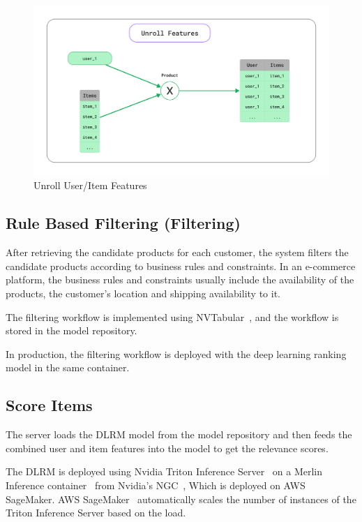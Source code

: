 \begin{figure}[H]
    \centering
    \includegraphics[width=\textwidth]{assets/Unroll Features.png}
    \caption{Unroll User/Item Features}
    \label{fig: UnrollUserFeatures}
\end{figure}


\subsection{Rule Based Filtering (Filtering)}

After retrieving the candidate products for each customer, the system filters the candidate products according to business rules and constraints.
In an e-commerce platform, the business rules and constraints usually include the availability of the products, the customer's location and shipping availability to it.


The filtering workflow is implemented using NVTabular~\cite{MerlinNVTabular}, and the workflow is stored in the model repository.

In production, the filtering workflow is deployed with the deep learning ranking model in the same container.


\subsection{Score Items}

The server loads the DLRM model from the model repository and then feeds the combined user and item features into the model to get the relevance scores.

The DLRM is deployed using Nvidia Triton Inference Server~\cite{Triton} on a Merlin Inference container~\cite{NvidiaMerlinInference} from Nvidia's NGC~\cite{NvidiaNGC}, Which is deployed on AWS SageMaker.
AWS SageMaker~\cite{AwsSageMaker} automatically scales the number of instances of the Triton Inference Server based on the load.


